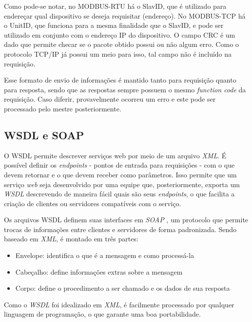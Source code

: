         Como pode-se notar, no MODBUS-RTU há o SlavID, que é utilizado para endereçar qual dispositivo se deseja requisitar (endereço). No MODBUS-TCP há o UnitID, que funciona para a mesma finalidade que o SlavID, e pode ser utilizado em conjunto com o endereço IP do dispositivo. O campo CRC é um dado que permite checar se o pacote obtido possui ou não algum erro. Como o protocolo TCP/IP já possui um meio para isso, tal campo não é incluído na requisição.

        Esse formato de envio de informações é mantido tanto para requisição quanto para resposta, sendo que as respostas sempre possuem o mesmo \textit{function code} da requisição. Caso diferir, provavelmente ocorreu um erro e este pode ser processado pelo mestre posteriormente.

    \subsection{WSDL e SOAP}
    \label{methodology:tools:wsdlsoap}

      O WSDL \cite{w3c-spec-wsdl} permite descrever serviços web por meio de um arquivo \textit{\ac{XML}}. É possível definir os \textit{endpoints} - pontos de entrada para requisições - com o que devem retornar e o que devem receber como parâmetros. Isso permite que um serviço \textit{web} seja desenvolvido por uma equipe que, posteriormente, exporta um \textit{\ac{WSDL}} descrevendo de maneira fácil quais são seus \textit{endpoints}, o que facilita a criação de clientes ou servidores compatíveis com o serviço.

      Os arquivos WSDL definem suas interfaces em \textit{\ac{SOAP}} \cite{w3c-spec-soap}, um protocolo que permite trocas de informações entre clientes e servidores de forma padronizada. Sendo baseado em \textit{\ac{XML}}, é montado em três partes:
      \begin{itemize}
        \item Envelope: identifica o que é a mensagem e como processá-la
        \item Cabeçalho: define informações extras sobre a mensagem
        \item Corpo: define o procedimento a ser chamado e os dados de sua resposta
      \end{itemize}

      Como o \textit{\ac{WSDL}} foi idealizado em \textit{\ac{XML}}, é facilmente processado por qualquer linguagem de programação, o que garante uma boa portabilidade.

